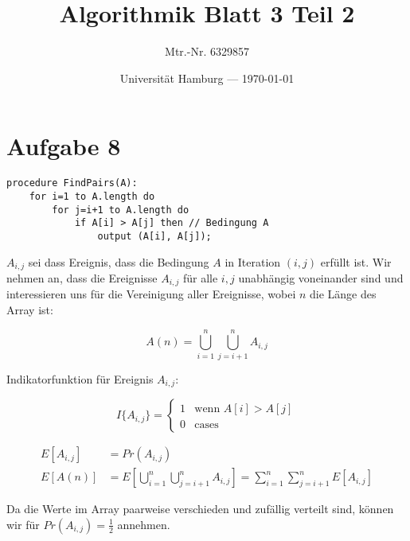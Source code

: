\documentclass[parskip=half,a4paper]{scrartcl}
\title{Algorithmik Blatt 3 Teil 2}
\author{Mtr.-Nr. 6329857}
\date{Universität Hamburg --- \today}
\begin{document}
\maketitle %

\linenumbers

\section*{Aufgabe 8}

\begin{verbatim}
procedure FindPairs(A):
    for i=1 to A.length do
        for j=i+1 to A.length do
            if A[i] > A[j] then // Bedingung A
                output (A[i], A[j]);
\end{verbatim}


$A_{i,j}$ sei dass Ereignis, dass die Bedingung $A$ in Iteration $(i,j)$ erfüllt ist. Wir nehmen an, dass die Ereignisse $A_{i,j}$ für alle $i,j$ unabhängig voneinander sind und interessieren uns für die Vereinigung aller Ereignisse, wobei $n$ die Länge des Array ist:

\begin{equation}
A(n) = \bigcup_{i=1}^{n}{\bigcup_{j=i+1}^n}A_{i,j}
\end{equation}

Indikatorfunktion für Ereignis $A_{i,j}$:

\begin{equation}
I\{A_{i,j}\} = \begin{cases}
1 & \text{wenn $A[i] > A[j]$}\\
0 & \text{cases}
\end{cases}
\end{equation}

\begin{equation}
\begin{aligned}
   E\left[A_{i,j}\right] &= Pr(A_{i,j})\\
   E\left[A(n)\right] &= E\left[\bigcup_{i=1}^n{\bigcup_{j=i+1}^n}A_{i,j}\right] = \sum_{i=1}^n{\sum_{j=i+1}^n}E\left[A_{i,j}\right]
\end{aligned}
\end{equation}

Da die Werte im Array paarweise verschieden und zufällig verteilt sind, können wir für $Pr(A_{i,j}) = \frac{1}{2}$ annehmen.
\end{document}
